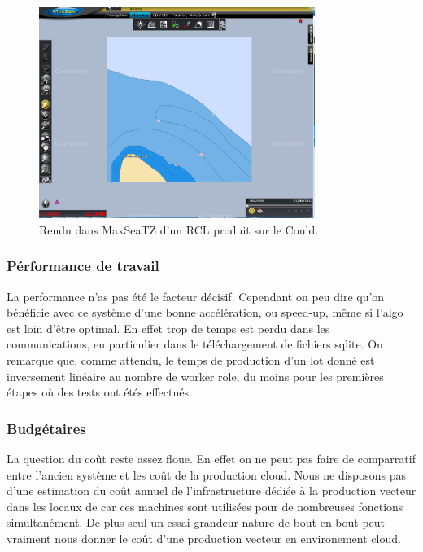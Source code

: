 \begin{figure}[h!]
  \caption{Rendu dans MaxSeaTZ d'un RCL produit sur le Could.}
  \centering
    \includegraphics[width=0.8\textwidth]{images/rcl_L10_R799_C146.png}
\end{figure}

%
%



\subsubsection{Pérformance de travail}
La performance n'as pas été le facteur décisif.  Cependant on peu dire
qu'on bénéficie avec ce système d'une bonne accélération, ou speed-up,
même si l'algo est loin d'être optimal. En effet trop de temps est
perdu dans les communications, en particulier dans le téléchargement
de fichiers sqlite. On remarque que, comme attendu, le temps de
production d'un lot donné est inversement linéaire au nombre de worker
role, du moins pour les premières étapes où des tests ont étés
effectués.

\subsubsection{Budgétaires}
La question du coût reste assez floue. En effet on ne peut pas faire
de comparratif entre l'ancien système et les coût de la production
cloud. Nous ne disposons pas d'une estimation du coût annuel de
l'infrastructure dédiée à la production vecteur dans les locaux de
\maxsea car ces machines sont utilisées pour de nombreuses fonctions
simultanément. De plus seul un essai grandeur nature de bout en bout
peut vraiment nous donner le coût d'une production vecteur en
environement cloud.


